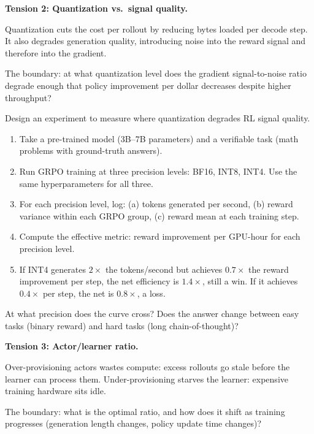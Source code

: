 
\textbf{Tension 2: Quantization vs.\ signal quality.}

Quantization cuts the cost per rollout by reducing bytes loaded per decode step. It also degrades generation quality, introducing noise into the reward signal and therefore into the gradient.

The boundary: at what quantization level does the gradient signal-to-noise ratio degrade enough that policy improvement per dollar decreases despite higher throughput?

\begin{exercise}
Design an experiment to measure where quantization degrades RL signal quality.

\begin{enumerate}
  \item Take a pre-trained model (3B--7B parameters) and a verifiable task (math problems with ground-truth answers).
  \item Run GRPO training at three precision levels: BF16, INT8, INT4. Use the same hyperparameters for all three.
  \item For each precision level, log: (a) tokens generated per second, (b) reward variance within each GRPO group, (c) reward mean at each training step.
  \item Compute the effective metric: reward improvement per GPU-hour for each precision level.
  \item If INT4 generates $2\times$ the tokens/second but achieves $0.7\times$ the reward improvement per step, the net efficiency is $1.4\times$, still a win. If it achieves $0.4\times$ per step, the net is $0.8\times$, a loss.
\end{enumerate}

At what precision does the curve cross? Does the answer change between easy tasks (binary reward) and hard tasks (long chain-of-thought)?
\end{exercise}


\textbf{Tension 3: Actor/learner ratio.}

Over-provisioning actors wastes compute: excess rollouts go stale before the learner can process them. Under-provisioning starves the learner: expensive training hardware sits idle.

The boundary: what is the optimal ratio, and how does it shift as training progresses (generation length changes, policy update time changes)?

